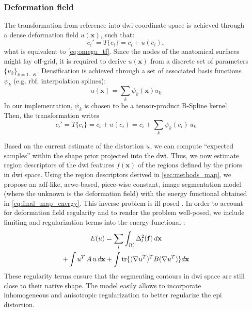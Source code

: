 \subsubsection{Deformation field}
\label{sec:deformation_field}
The transformation from reference into \gls{dwi} coordinate space is 
achieved through a dense deformation field $u(\mathbf{x})$, such that:
\begin{equation}
c_i' = T\{c_i\} = c_i + u(c_i),
\end{equation}
what is equivalent to \eqref{eq:omega_tf}. Since the nodes of the anatomical 
surfaces might lay off-grid, it is required to derive $u(\mathbf{x})$ from a discrete 
set of parameters $\{u_k\}_{k=1 \ldots K}$. Densification is achieved through 
a set of associated basis functions $\psi_k$ (e.g. rbf, interpolation splines):
%
\begin{equation}
u(\mathbf{x}) = \sum_k \psi_k(\mathbf{x}) u_k
\end{equation}
%
In our implementation, $\psi_k$ is chosen to be a tensor-product B-Spline kernel.
Then, the transformation writes
%
\begin{equation}
\label{eq:transformation}
c_i' = T\{c_i\} = c_i + u(c_i) = c_i + \sum_k \psi_k(c_i)\,u_k
\end{equation} 

Based on the current estimate of the distortion $u$, we can compute 
``expected samples'' within the shape prior projected into the \gls{dwi}.
Thus, we now estimate region descriptors of the \gls{dwi} features 
$f(\mathbf{x})$ of the regions defined by the priors in \gls{dwi} space.
%
Using the region descriptors derived in \autoref{sec:methods_map}, we propose
an \gls{adf}-like, \gls{acwe}-based, piece-wise constant, image segmentation
model (where the unknown is the deformation field)
\cite{chan_active_2001} with the energy functional obtained in 
\eqref{eq:final_map_energy}. This inverse problem is ill-posed
\cite{bertero_ill-posed_1988,hadamard_sur_1902}.
In order to account for deformation field regularity and to render the 
problem well-posed, we include limiting and regularization terms into 
the energy functional \cite{morozov_linear_1975,tichonov_solution_1963}:
%
\begin{multline}
E(u) = \sum\limits_l \int_{\Omega'_l} \Delta^2_l (\mathbf{f}) \,d\mathbf{x} \\
+ \int u^T \, A \, u \, d\mathbf{x} + \int \tr\{(\nabla u^T)^T B (\nabla u^T)\} d\mathbf{x}
\label{eq:complete_energy}
\end{multline}
%
These regularity terms ensure that the segmenting contours in 
\gls{dwi} space are still close to their native shape. The model
easily allows to incorporate inhomogeneous and anisotropic 
regularization \cite{nagel_investigation_1986} to better regularize
the \gls{epi} distortion.



